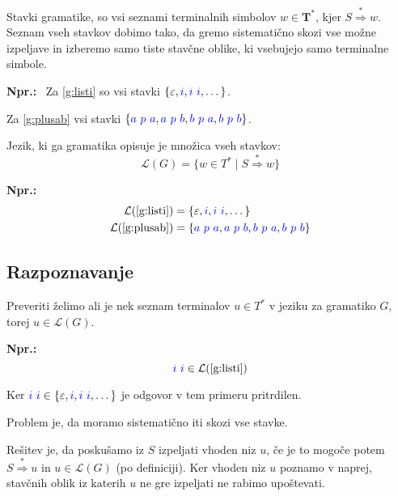 \documentclass{article}
\newcommand{\Ex}{\textbf{Npr.:}\ }
\newcommand{\Set}[1]{\mathbf{#1}}
\newcommand{\Symbol}[1]{\textcolor{blue}{#1}}
\newcommand{\Grammar}{G}
\newcommand{\Terminals}{\Set{T}}
\newcommand{\StartSymbol}{S}
\newcommand{\Null}{\varepsilon}
\newcommand{\Language}[1]{\mathcal{L}(#1)}
\newcommand{\MathRef}[1]{\text{\ref{#1}}}
\newcommand{\DeriveStar}{\overset{\ast}{\Rightarrow}}
\newcommand{\Seq}{\ }
\newcommand{\Kleene}[1]{#1^\ast}
\begin{document}
Stavki gramatike, so vsi seznami terminalnih simbolov $w \in \Kleene{\Terminals}$, kjer $\StartSymbol \DeriveStar w$.
Seznam vseh stavkov dobimo tako, da gremo sistematično skozi vse možne izpeljave in izberemo samo tiste stavčne oblike, ki vsebujejo samo terminalne simbole.

\Ex
Za \ref{g:listi} so vsi stavki $\{\Null, \Symbol{i}, \Symbol{i} \Seq \Symbol{i}, \dots\}$.

Za \ref{g:plusab} vsi stavki $\{\Symbol{a} \Seq \Symbol{p} \Seq \Symbol{a}, \Symbol{a} \Seq \Symbol{p} \Seq \Symbol{b}, \Symbol{b} \Seq \Symbol{p} \Seq \Symbol{a}, \Symbol{b} \Seq \Symbol{p} \Seq \Symbol{b} \}$.

Jezik, ki ga gramatika opisuje je množica vseh stavkov:
\begin{equation*}
  \Language{\Grammar} = \{ w \in \Kleene{T} \mid \StartSymbol \DeriveStar w\}
\end{equation*}

\Ex
  \begin{align*}
    \Language{\MathRef{g:listi}} &= \{\Null, \Symbol{i}, \Symbol{i} \Seq \Symbol{i}, \dots\}\\
    \Language{\MathRef{g:plusab}} &= \{\Symbol{a} \Seq \Symbol{p} \Seq \Symbol{a}, \Symbol{a} \Seq \Symbol{p} \Seq \Symbol{b}, \Symbol{b} \Seq \Symbol{p} \Seq \Symbol{a}, \Symbol{b} \Seq \Symbol{p} \Seq \Symbol{b} \}
  \end{align*}

\subsection{Razpoznavanje}

Preveriti želimo ali je nek seznam terminalov $u \in \Kleene{T}$ v jeziku za gramatiko $\Grammar$, torej $u \in \Language{\Grammar}$.

\Ex
  \begin{equation*}
    \Symbol{i} \Seq \Symbol{i} \in \Language{\MathRef{g:listi}}
  \end{equation*}

  Ker $\Symbol{i} \Seq \Symbol{i} \in \{\Null, \Symbol{i}, \Symbol{i} \Seq \Symbol{i}, \dots\}$ je odgovor v tem primeru pritrdilen.

Problem je, da moramo sistematično iti skozi vse stavke.

Rešitev je, da poskušamo iz $\StartSymbol$ izpeljati vhoden niz $u$, če je to mogoče potem $\StartSymbol \DeriveStar u$ in $u \in \Language{\Grammar}$ (po definiciji).
Ker vhoden niz $u$ poznamo v naprej, stavčnih oblik iz katerih $u$ ne gre izpeljati ne rabimo upoštevati.
\end{document}
